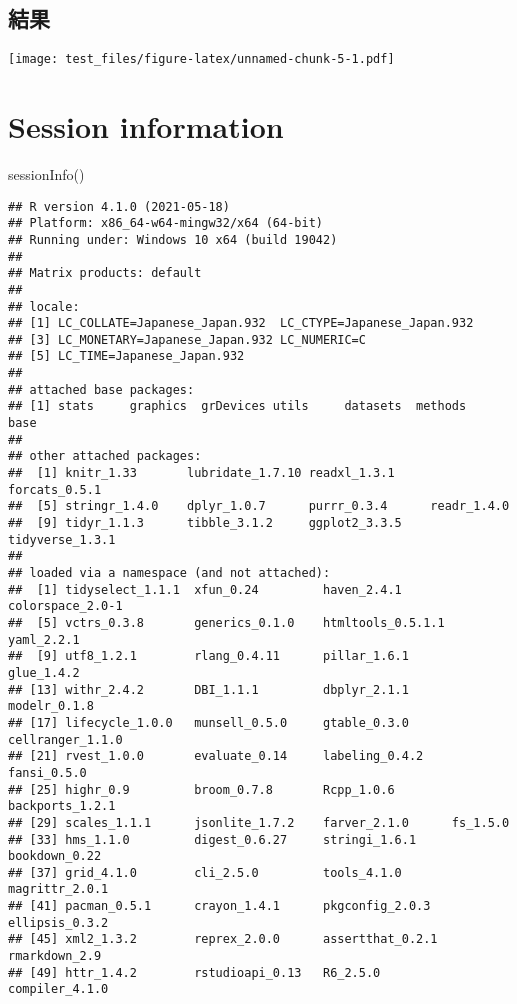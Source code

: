 \documentclass[
]{book}
\newenvironment{Shaded}{\begin{snugshade}}{\end{snugshade}}
\newcommand{\FunctionTok}[1]{\textcolor[rgb]{0.00,0.00,0.00}{#1}}
\newcommand{\NormalTok}[1]{#1}
\begin{document}
\hypertarget{ux7d50ux679c-1}{%
\section{結果}\label{ux7d50ux679c-1}}

\texttt{[image: test\_files/figure-latex/unnamed-chunk-5-1.pdf]}

\hypertarget{session-information}{%
\chapter{Session information}\label{session-information}}

\begin{Shaded}
\begin{Highlighting}[]
\FunctionTok{sessionInfo}\NormalTok{()}
\end{Highlighting}
\end{Shaded}

\begin{verbatim}
## R version 4.1.0 (2021-05-18)
## Platform: x86_64-w64-mingw32/x64 (64-bit)
## Running under: Windows 10 x64 (build 19042)
## 
## Matrix products: default
## 
## locale:
## [1] LC_COLLATE=Japanese_Japan.932  LC_CTYPE=Japanese_Japan.932   
## [3] LC_MONETARY=Japanese_Japan.932 LC_NUMERIC=C                  
## [5] LC_TIME=Japanese_Japan.932    
## 
## attached base packages:
## [1] stats     graphics  grDevices utils     datasets  methods   base     
## 
## other attached packages:
##  [1] knitr_1.33       lubridate_1.7.10 readxl_1.3.1     forcats_0.5.1   
##  [5] stringr_1.4.0    dplyr_1.0.7      purrr_0.3.4      readr_1.4.0     
##  [9] tidyr_1.1.3      tibble_3.1.2     ggplot2_3.3.5    tidyverse_1.3.1 
## 
## loaded via a namespace (and not attached):
##  [1] tidyselect_1.1.1  xfun_0.24         haven_2.4.1       colorspace_2.0-1 
##  [5] vctrs_0.3.8       generics_0.1.0    htmltools_0.5.1.1 yaml_2.2.1       
##  [9] utf8_1.2.1        rlang_0.4.11      pillar_1.6.1      glue_1.4.2       
## [13] withr_2.4.2       DBI_1.1.1         dbplyr_2.1.1      modelr_0.1.8     
## [17] lifecycle_1.0.0   munsell_0.5.0     gtable_0.3.0      cellranger_1.1.0 
## [21] rvest_1.0.0       evaluate_0.14     labeling_0.4.2    fansi_0.5.0      
## [25] highr_0.9         broom_0.7.8       Rcpp_1.0.6        backports_1.2.1  
## [29] scales_1.1.1      jsonlite_1.7.2    farver_2.1.0      fs_1.5.0         
## [33] hms_1.1.0         digest_0.6.27     stringi_1.6.1     bookdown_0.22    
## [37] grid_4.1.0        cli_2.5.0         tools_4.1.0       magrittr_2.0.1   
## [41] pacman_0.5.1      crayon_1.4.1      pkgconfig_2.0.3   ellipsis_0.3.2   
## [45] xml2_1.3.2        reprex_2.0.0      assertthat_0.2.1  rmarkdown_2.9    
## [49] httr_1.4.2        rstudioapi_0.13   R6_2.5.0          compiler_4.1.0
\end{verbatim}

  
\end{document}
